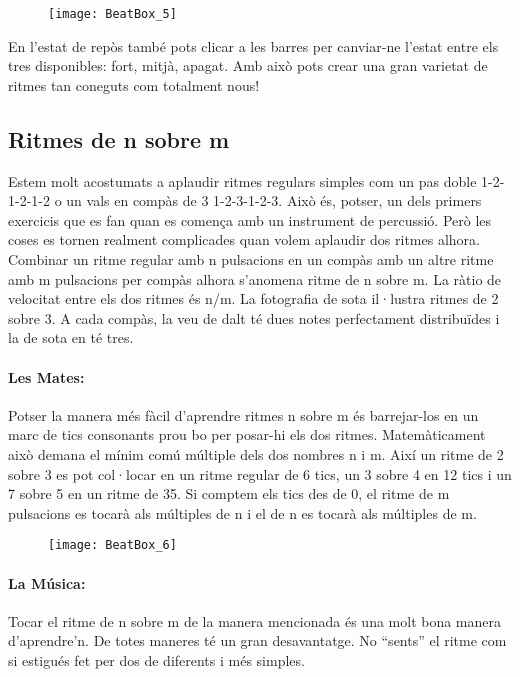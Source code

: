 \begin{figure}[h]
\centering
\texttt{[image: BeatBox\_5]}
\end{figure}

En l'estat de repòs també pots clicar a les barres per canviar-ne l'estat entre els tres disponibles: fort, mitjà, apagat. Amb això pots crear una gran varietat de ritmes tan coneguts com totalment nous!

\subsection{Ritmes de n sobre m}
Estem molt acostumats a aplaudir ritmes regulars simples com un pas doble 1-2-1-2-1-2 o un vals en compàs de 3 1-2-3-1-2-3. Això és, potser, un dels primers exercicis que es fan quan es comença amb un instrument de percussió. Però les coses es tornen realment complicades quan volem aplaudir dos ritmes alhora. Combinar un ritme regular amb n pulsacions en un compàs amb un altre ritme amb m pulsacions per compàs alhora s'anomena ritme de n sobre m. La ràtio de velocitat entre els dos ritmes és n/m. La fotografia de sota il·lustra ritmes de 2 sobre 3. A cada compàs, la veu de dalt té dues notes perfectament distribuïdes i la de sota en té tres.

\paragraph{Les Mates:}
Potser la manera més fàcil d'aprendre ritmes n sobre m és barrejar-los en un marc de tics consonants prou bo per posar-hi els dos ritmes. Matemàticament això demana el mínim comú múltiple dels dos nombres n i m. Així un ritme de 2 sobre 3 es pot col·locar en un ritme regular de 6 tics, un 3 sobre 4 en 12 tics i un 7 sobre 5 en un ritme de 35. Si comptem els tics des de 0, el ritme de m pulsacions es tocarà als múltiples de n i el de n es tocarà als múltiples de m.

\begin{figure}[h]
\centering
\texttt{[image: BeatBox\_6]}
\end{figure}

\paragraph{La Música:}Tocar el ritme de n sobre m de la manera mencionada és una molt bona manera d'aprendre'n. De totes maneres té un gran desavantatge. No ``sents'' el ritme com si estigués fet per dos de diferents i més simples.

